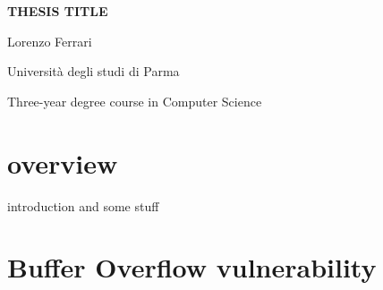 \documentclass{report}
\begin{document}
\begin{titlepage}
    \centering
    \vspace*{\fill}
    \Huge \textbf{THESIS TITLE}
    \vspace{2cm} 
    
    \Large Lorenzo Ferrari

    \vspace{2cm} %
    
    \Large Università degli studi di Parma
    \par
    Three-year degree course in Computer Science
    
 
\end{titlepage}

\renewcommand{\contentsname}{Index}
\tableofcontents
    
    
    
    \chapter{overview}
    introduction and some stuff
    \chapter{Buffer Overflow vulnerability}
\end{document}
